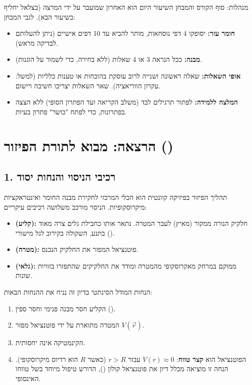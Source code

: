 \begin{physicsnote}{מנהלות: סוף הקורס והמבחן}
השיעור היום הוא האחרון שמועבר על ידי המרצה (בצלאל יחליף בשיעור הבא).
לגבי המבחן:
\begin{itemize}
    \item \textbf{חומר עזר:} יסופקו 4 דפי נוסחאות, מותר להביא עד 10 דפים אישיים (ניתן להעלותם לבדיקה מראש).
    \item \textbf{מבנה:} ככל הנראה 3 או 4 שאלות (ללא בחירה, כדי לשמור על הוגנות).
    \item \textbf{אופי השאלות:} שאלה ראשונה ושנייה לרוב עוסקת בהוכחות או טענות כלליות (למשל: עקרון הווריאציה). שאר השאלות יצריכו חשיבה ויישום.
    \item \textbf{המלצה ללמידה:} לפתור תרגילים לבד (משלב הקריאה ועד הפתרון הסופי) ללא הצצה בפתרונות, כדי לפתח "כושר" פתרון בעיות.
\end{itemize}
\end{physicsnote}


\section*{הרצאה: מבוא לתורת הפיזור ()}

\subsection*{1. רכיבי הניסוי והנחות יסוד}
תהליך הפיזור בפיזיקה קוונטית הוא הכלי המרכזי לחקירת מבנה החומר ואינטראקציות מיקרוסקופיות. הניסוי מורכב משלושה רכיבים עיקריים:
\begin{itemize}
    \item \textbf{ (קליע):} חלקיק הנורה ממקור (מאיץ) לעבר המטרה. נתאר אותו כחבילת גלים צרה מאוד בתנע, השקולה בקירוב לגל מישורי ().
    \item \textbf{ (מטרה):} פוטנציאל המפזר את החלקיק הנכנס.
    \item \textbf{ (גלאי):} ממוקם במרחק מאקרוסקופי מהמטרה ומודד את החלקיקים שהתפזרו בזוויות שונות.
\end{itemize}

\begin{definitionbox}{הנחות המודל הסינתטי}
בדיון זה נניח את ההנחות הבאות:
\begin{enumerate}
    \item הקליע חסר מבנה פנימי וחסר ספין ().
    \item המטרה מתוארת על ידי פוטנציאל מפזר $V(\vec{r})$.
    \item הקינמטיקה אינה יחסותית.
    \item הפוטנציאל הוא \textbf{קצר טווח}: $V(r) \approx 0$ עבור $r > R$ (כאשר $R$ הוא רדיוס מיקרוסקופי). הנחה זו מוציאה מכלל דיון את פוטנציאל קולון (), הדורש טיפול מיוחד בשל טווחו האינסופי.
\end{enumerate}
\end{definitionbox}

